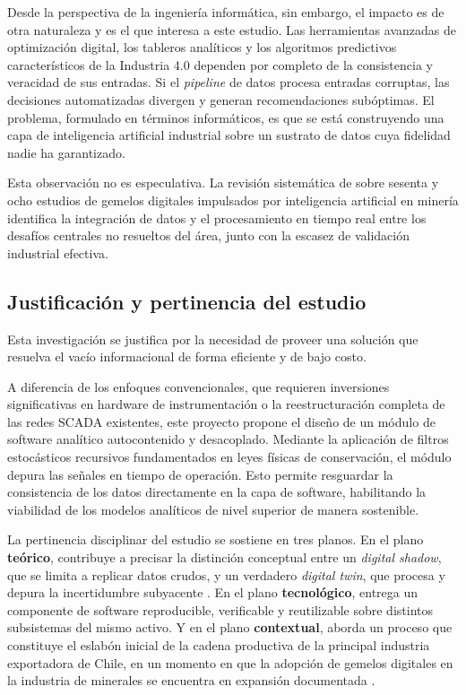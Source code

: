 Desde la perspectiva de la ingeniería informática, sin embargo, el impacto es de
otra naturaleza y es el que interesa a este estudio. Las herramientas avanzadas
de optimización digital, los tableros analíticos y los algoritmos predictivos
característicos de la Industria 4.0 dependen por completo de la consistencia y
veracidad de sus entradas. Si el \emph{pipeline} de datos procesa entradas
corruptas, las decisiones automatizadas divergen y generan recomendaciones
subóptimas. El problema, formulado en términos informáticos, es que se está
construyendo una capa de inteligencia artificial industrial sobre un sustrato de
datos cuya fidelidad nadie ha garantizado.

Esta observación no es especulativa. La revisión sistemática de
\textcite{ebad2026} sobre sesenta y ocho estudios de gemelos digitales
impulsados por inteligencia artificial en minería identifica la integración de
datos y el procesamiento en tiempo real entre los desafíos centrales no
resueltos del área, junto con la escasez de validación industrial efectiva.

\subsection{Justificación y pertinencia del estudio}

Esta investigación se justifica por la necesidad de proveer una solución que
resuelva el vacío informacional de forma eficiente y de bajo costo.

A diferencia de los enfoques convencionales, que requieren inversiones
significativas en hardware de instrumentación o la reestructuración completa de
las redes SCADA existentes, este proyecto propone el diseño de un módulo de
software analítico autocontenido y desacoplado. Mediante la aplicación de
filtros estocásticos recursivos fundamentados en leyes físicas de conservación,
el módulo depura las señales en tiempo de operación. Esto permite resguardar la
consistencia de los datos directamente en la capa de software, habilitando la
viabilidad de los modelos analíticos de nivel superior de manera sostenible.

La pertinencia disciplinar del estudio se sostiene en tres planos. En el plano
\textbf{teórico}, contribuye a precisar la distinción conceptual entre un
\emph{digital shadow}, que se limita a replicar datos crudos, y un verdadero
\emph{digital twin}, que procesa y depura la incertidumbre subyacente
\parencite{sepasgozar2021}. En el plano \textbf{tecnológico}, entrega un
componente de software reproducible, verificable y reutilizable sobre distintos
subsistemas del mismo activo. Y en el plano \textbf{contextual}, aborda un
proceso que constituye el eslabón inicial de la cadena productiva de la
principal industria exportadora de Chile, en un momento en que la adopción de
gemelos digitales en la industria de minerales se encuentra en expansión
documentada \parencite{qu2023}.
